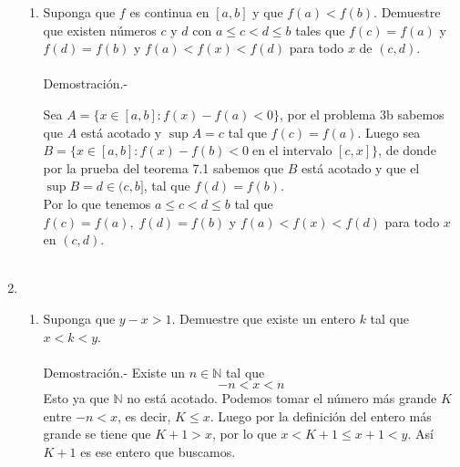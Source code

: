 \begin{enumerate}[\bfseries 1.]
\begin{enumerate}[\bfseries (a)]
	    \item Suponga que $f$ es continua en $[a,b]$ y que $f(a)<f(b)$. Demuestre que existen números $c$ y $d$ con $a\leq c<d\leq b$ tales que $f(c)=f(a)$ y $f(d)=f(b)$ y $f(a)<f(x)<f(d)$ para todo $x$ de $(c,d)$.\\\\
		Demostración.-\; 
		\begin{center}
		\end{center}
		\vspace{.5cm}
		Sea $A=\lbrace x\in [a,b]:f(x)-f(a)<0\rbrace$, por el problema 3b sabemos que $A$ está acotado y $\sup A = c$ tal que $f(c)=f(a).$ Luego sea $B=\lbrace x\in [a,b]:f(x)-f(b)<0 \; \mbox{en el intervalo }[c,x]\rbrace$, de donde por la prueba del teorema 7.1 sabemos que $B$ está acotado y que el $\sup B = d\in (c,b]$, tal que $f(d)=f(b)$.\\
		Por lo que tenemos  $a\leq c<d\leq b$ tal que $f(c)=f(a),\; f(d)=f(b)$ y $f(a)<f(x)<f(d)$ para todo $x$ en $(c,d)$.\\\\

	\end{enumerate}

    \item 
	\begin{enumerate}[\bfseries (a)]

	    \item Suponga que $y-x>1.$ Demuestre que existe un entero $k$ tal que $x<k<y$.\\\\
		Demostración.-\; Existe un $n\in \mathbb{N}$ tal que 
		$$-n<x<n$$
		Esto ya que $\mathbb{N}$ no está acotado. Podemos tomar el  número más grande $K$ entre $-n<x$, es decir, $K\leq x.$ Luego por la definición del entero más grande se tiene que $K+1>x$, por lo que $x<K+1\leq x+1<y$. Así $K+1$ es ese entero que buscamos.\\\\
		

\end{enumerate}
\end{enumerate}

